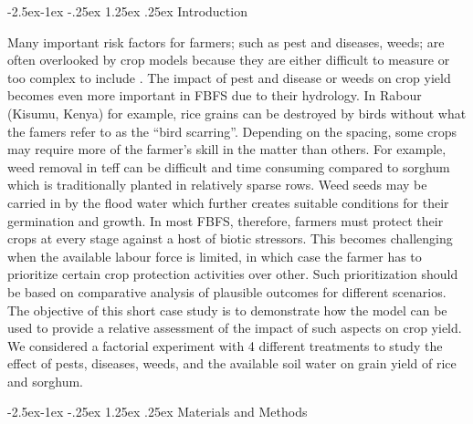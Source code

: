 \documentclass[12pt,oneside]{article}
\makeatletter
\renewcommand\paragraph{\@startsection{paragraph}{4}{\z@}%
            {-2.5ex\@plus -1ex \@minus -.25ex}%
            {1.25ex \@plus .25ex}%
            {\normalfont\normalsize\bfseries}}
\makeatother
\begin{document}
\hypertarget{introduction-3}{%
\paragraph{Introduction}\label{introduction-3}}

Many important risk factors for farmers; such as pest and diseases,
weeds; are often overlooked by crop models because they are either
difficult to measure or too complex to include . The impact of pest and
disease or weeds on crop yield becomes even more important in FBFS due
to their hydrology. In Rabour (Kisumu, Kenya) for example, rice grains
can be destroyed by birds without what the famers refer to as the ``bird
scarring''. Depending on the spacing, some crops may require more of the
farmer's skill in the matter than others. For example, weed removal in
teff can be difficult and time consuming compared to sorghum which is
traditionally planted in relatively sparse rows. Weed seeds may be
carried in by the flood water which further creates suitable conditions
for their germination and growth. In most FBFS, therefore, farmers must
protect their crops at every stage against a host of biotic stressors.
This becomes challenging when the available labour force is limited, in
which case the farmer has to prioritize certain crop protection
activities over other. Such prioritization should be based on
comparative analysis of plausible outcomes for different scenarios. The
objective of this short case study is to demonstrate how the model can
be used to provide a relative assessment of the impact of such aspects
on crop yield. We considered a factorial experiment with 4 different
treatments to study the effect of pests, diseases, weeds, and the
available soil water on grain yield of rice and sorghum.

\hypertarget{materials-and-methods-1}{%
\paragraph{Materials and Methods}\label{materials-and-methods-1}}
\end{document}
